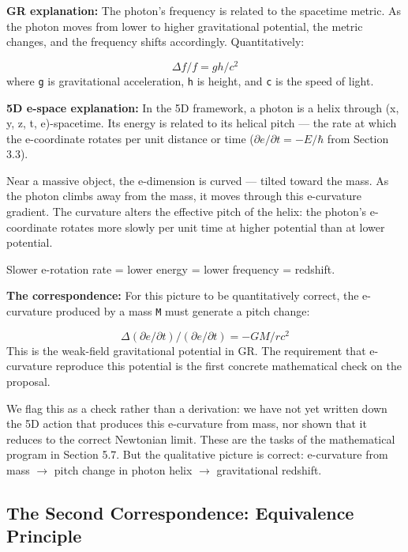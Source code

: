 \documentclass[aps,prd,preprint,superscriptaddress,longbibliography,floatfix]{revtex4-2}
\theoremstyle{remark}
\begin{document}
\textbf{GR explanation:} The photon's frequency is related to the spacetime metric. As the photon moves from lower to higher gravitational potential, the metric changes, and the frequency shifts accordingly. Quantitatively:


\begin{equation}
    \Delta f/f = gh/c^{2}
\end{equation}
where \texttt{g} is gravitational acceleration, \texttt{h} is height, and \texttt{c} is the speed of light.

\textbf{5D e-space explanation:} In the 5D framework, a photon is a helix through (x, y, z, t, e)-spacetime. Its energy is related to its helical pitch --- the rate at which the e-coordinate rotates per unit distance or time ($\partial e/\partial t = -E/\hbar$ from Section 3.3).

Near a massive object, the e-dimension is curved --- tilted toward the mass. As the photon climbs away from the mass, it moves through this e-curvature gradient. The curvature alters the effective pitch of the helix: the photon's e-coordinate rotates more slowly per unit time at higher potential than at lower potential.

Slower e-rotation rate = lower energy = lower frequency = redshift.

\textbf{The correspondence:} For this picture to be quantitatively correct, the e-curvature produced by a mass \texttt{M} must generate a pitch change:


\begin{equation}
    \Delta(\partial e/\partial t) / (\partial e/\partial t) = -GM/rc^{2}
\end{equation}
This is the weak-field gravitational potential in GR. The requirement that e-curvature reproduce this potential is the first concrete mathematical check on the proposal.

We flag this as a check rather than a derivation: we have not yet written down the 5D action that produces this e-curvature from mass, nor shown that it reduces to the correct Newtonian limit. These are the tasks of the mathematical program in Section 5.7. But the qualitative picture is correct: e-curvature from mass $\to$ pitch change in photon helix $\to$ gravitational redshift.



\subsection{The Second Correspondence: Equivalence Principle}
\end{document}
